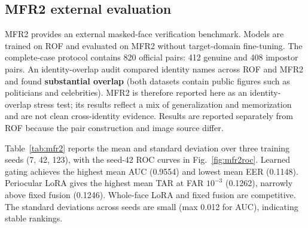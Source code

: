 ﻿\documentclass[10pt,journal,compsoc]{IEEEtran}
\begin{document}
\subsection{MFR2 external evaluation}
MFR2 provides an external masked-face verification benchmark. Models are trained on ROF and evaluated on MFR2 without target-domain fine-tuning. The complete-case protocol contains 820 official pairs: 412 genuine and 408 impostor pairs. An identity-overlap audit compared identity names across ROF and MFR2 and found \textbf{substantial overlap} (both datasets contain public figures such as politicians and celebrities). MFR2 is therefore reported here as an identity-overlap stress test; its results reflect a mix of generalization and memorization and are not clean cross-identity evidence. Results are reported separately from ROF because the pair construction and image source differ.

Table~\ref{tab:mfr2} reports the mean and standard deviation over three training seeds (7, 42, 123), with the seed-42 ROC curves in Fig.~\ref{fig:mfr2roc}. Learned gating achieves the highest mean AUC (0.9554) and lowest mean EER (0.1148). Periocular LoRA gives the highest mean TAR at FAR $10^{-3}$ (0.1262), narrowly above fixed fusion (0.1246). Whole-face LoRA and fixed fusion are competitive. The standard deviations across seeds are small (max 0.012 for AUC), indicating stable rankings.
\end{document}

